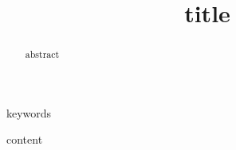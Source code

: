 \documentclass[conference]{IEEEtran}
\begin{document}
\title{{{ title }}}

\author{
}

\maketitle

\begin{abstract}
{{ abstract }}
\end{abstract}

\begin{IEEEkeywords}
{{ keywords }}
\end{IEEEkeywords}

{{ content }}



\end{document}
